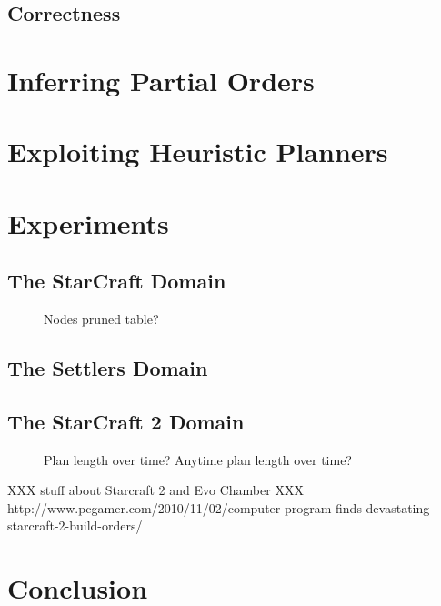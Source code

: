 \documentclass[letterpaper]{article}
\begin{document}
\subsection{Correctness}

\section{Inferring Partial Orders}

\section{Exploiting Heuristic Planners}

\section{Experiments}

\subsection{The StarCraft Domain}
\begin{figure}
  \caption{Nodes pruned table?}
\end{figure}
\subsection{The Settlers Domain}
\subsection{The StarCraft 2 Domain}
\begin{figure}
  \caption{Plan length over time? Anytime plan length over time?}
\end{figure}

XXX stuff about Starcraft 2 and Evo Chamber
XXX http://www.pcgamer.com/2010/11/02/computer-program-finds-devastating-starcraft-2-build-orders/

\section{Conclusion}
\end{document}
